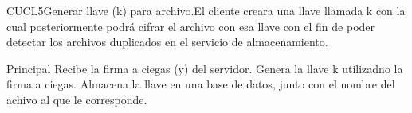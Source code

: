 


\begin{UseCase}{CUCL5}{Generar llave (k) para archivo.}{El cliente creara una llave llamada k con la cual posteriormente podrá cifrar el archivo con esa llave con el fin de poder detectar los archivos duplicados en el servicio de almacenamiento.}

\end{UseCase}


\begin{UCtrayectoria}{Principal}
	\UCpaso Recibe la firma a ciegas (y) del servidor.
	\UCpaso Genera la llave k utilizadno la firma a ciegas.
	\UCpaso Almacena la llave en una base de datos, junto con el nombre del achivo al que le corresponde.
\end{UCtrayectoria}



